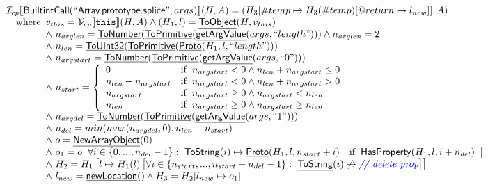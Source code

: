 \documentclass{article}
\makeatletter
\newcommand{\SF}[1]{\mbox{\textsf{#1}}}
\newcommand{\TT}[1]{\mbox{\texttt{#1}}}
\newcommand{\comment}[1]{\textit{#1}}
\newcommand{\wherec}[1]{{\rm where}\begin{array}[t]{l}#1\end{array}}
\newcommand{\ifc}[1]{{\rm if}\begin{array}[t]{l}#1\end{array}}
\newcommand{\I}{\mathcal{I}}
\newcommand{\V}{\mathcal{V}}
\newcommand{\lbr}{\llbracket}
\newcommand{\rbr}{\rrbracket}
\newcommand{\hf}[1]{\underline{\sf #1}}
\newcommand{\varloc}[1]{\##1}
\newcommand{\varprop}[1]{@#1}
\def\inblue{\color{blue}}
\def\inblue{\color{blue}}
\makeatother
\begin{document}
\[\begin{array}{l}
\I _{cp}\lbr \SF{BuiltintCall}(``\SF{Array.prototype.splice}",args)\rbr(H,A)
 = (H_3[\varloc{temp}\mapsto H_3(\varloc{temp})[\varprop{return}\mapsto l_{new}]], A) \\
\quad\wherec{
  v_{this} = \V _{cp}\lbr \TT{this}\rbr (H,A) \land (H_1,l) = \hf{ToObject}(H,v_{this})\\
  \land\ n_{arglen} = \hf{ToNumber}(\hf{ToPrimitive}(\hf{getArgValue}(args, ``length")))
  \land n_{arglen} = 2\\
  \land\ n_{len} = \hf{ToUInt32}(\hf{ToPrimitive}(\hf{Proto}(H_1, l, ``length")))\\
  \land\ n_{argstart} = \hf{ToNumber}(\hf{ToPrimitive}(\hf{getArgValue}(args, ``0")))\\
  \land\ n_{start} = \left\{\begin{array}{ll}
      0 & \ifc{n_{argstart} < 0 \land n_{len} + n_{argstart} \leq 0}\\
      n_{len} + n_{argstart} & \ifc{n_{argstart} < 0 \land n_{len} + n_{argstart} > 0}\\
      n_{argstart} & \ifc{n_{argstart} \geq 0 \land n_{argstart} < n_{len}}\\
      n_{len}  & \ifc{n_{argstart} \geq 0 \land n_{argstart} \geq n_{len}}\\
    \end{array}\right.\\
  \land\ n_{argdel} = \hf{ToNumber}(\hf{ToPrimitive}(\hf{getArgValue}(args, ``1")))\\
  \land\ n_{del} = min(max(n_{argdel}, 0), n_{len} - n_{start})\\
  \land\ o = \hf{NewArrayObject}(0)\\
  \land\ o_1 = o\left[\forall i \in \{0,...,n_{del}-1\}: \
    \hf{ToString}(i) \mapsto \hf{Proto}(H_1, l, n_{start}+i)
    \quad\ifc{\hf{HasProperty}(H_1, l, i+n_{del})}\right]\\
  \land\ H_2 = H_1\left[l \mapsto H_1(l)\left[\forall i \in \{n_{start},...,n_{start}+n_{del}-1\}: \
    \hf{ToString}(i) \not\mapsto  \comment{{\inblue // delete prop}}\right]\right]\\
  \land\ l_{new} = \hf{newLocation}() \land H_3 = H_2[l_{new} \mapsto o_1]
  }\\
  
\end{array}
\]
\end{document}
